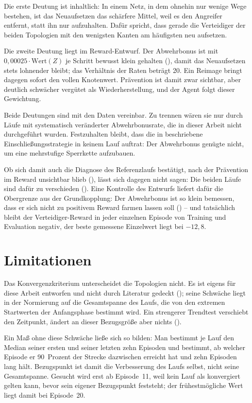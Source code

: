 Die erste Deutung ist inhaltlich: In einem Netz, in dem ohnehin nur wenige
Wege bestehen, ist das Neuaufsetzen das schärfere Mittel, weil es den
Angreifer entfernt, statt ihn nur aufzuhalten. Dafür spricht, dass gerade die
Verteidiger der beiden Topologien mit den wenigsten Kanten am häufigsten neu
aufsetzen.

Die zweite Deutung liegt im Reward-Entwurf. Der Abwehrbonus ist mit
$0{,}00025 \cdot \text{Wert}(Z)$ je Schritt bewusst klein gehalten
(), damit das Neuaufsetzen stets lohnender bleibt; das
Verhältnis der Raten beträgt 20. Ein Reimage bringt dagegen sofort den vollen
Knotenwert. Prävention ist damit zwar sichtbar, aber deutlich schwächer
vergütet als Wiederherstellung, und der Agent folgt dieser Gewichtung.

Beide Deutungen sind mit den Daten vereinbar. Zu trennen wären sie nur durch
Läufe mit systematisch veränderter Abwehrbonusrate, die in dieser Arbeit nicht
durchgeführt wurden. Festzuhalten bleibt, dass die in
 beschriebene Einschließungsstrategie in keinem Lauf
auftrat: Der Abwehrbonus genügte nicht, um eine mehrstufige Sperrkette
aufzubauen.

Ob sich damit auch die Diagnose des Referenzlaufs bestätigt, nach der
Prävention im Reward unsichtbar blieb (), lässt
sich dagegen nicht sagen: Die beiden Läufe sind dafür zu verschieden
(). Eine Kontrolle des Entwurfs liefert dafür die Obergrenze aus der
Grundkopplung: Der Abwehrbonus ist so klein bemessen, dass er sich nicht zu
positivem Reward farmen lassen soll () -- und
tatsächlich bleibt der Verteidiger-Reward in jeder einzelnen Episode von
Training und Evaluation negativ, der beste gemessene Einzelwert liegt bei
$-12{,}8$.

\section{Limitationen}
\label{sec:limitationen}

Das Konvergenzkriterium unterscheidet die Topologien nicht. Es ist eigens für
diese Arbeit entworfen und nicht durch Literatur gedeckt
(); seine Schwäche liegt in der Normierung auf die
Gesamtspanne des Laufs, die von den extremen Startwerten der Anfangsphase
bestimmt wird. Ein strengerer Trendtest verschiebt den Zeitpunkt, ändert an
dieser Bezugsgröße aber nichts ().

Ein Maß ohne diese Schwäche ließe sich so bilden: Man bestimmt je Lauf den
Median seiner ersten und seiner letzten zehn Episoden und bestimmt, ab
welcher
Episode er 90~Prozent der Strecke dazwischen erreicht hat und zehn Episoden
lang hält. Bezugspunkt ist damit die Verbesserung des Laufs selbst, nicht seine
Gesamtspanne. Gesucht wird erst ab Episode~11, weil kein Lauf als konvergiert
gelten kann, bevor sein eigener Bezugspunkt feststeht; der frühestmögliche Wert
liegt damit bei Episode~20.


